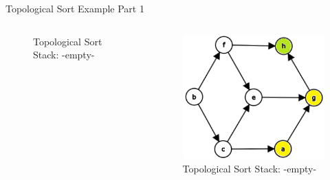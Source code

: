 \documentclass[aspectratio=169]{beamer}%
\begin{document}
\begin{frame}{Topological Sort Example Part 1}
\begin{columns}
\begin{column}{.32\textwidth}
\begin{figure}
                \caption{Topological Sort Stack: -empty-}
            \end{figure}            
        \end{column}
        \hfill
        \begin{column}{.32\textwidth}
            \begin{figure}
                \centering
                \includegraphics[width = .9\linewidth]{topsort3.png}
                \caption{Topological Sort Stack: -empty-}
            \end{figure}     
        \end{column}
    \end{columns}
\end{frame}
\end{document}
